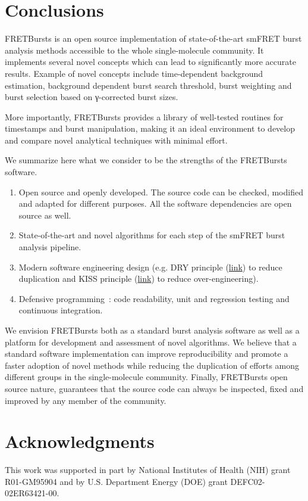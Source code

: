 \section{Conclusions}
\label{sec:conclusions}

FRETBursts is an open source implementation of state-of-the-art smFRET burst analysis methods
accessible to the whole single-molecule community.
It implements several novel concepts which can lead
to significantly more accurate results. Example of novel concepts include
time-dependent background estimation, background dependent burst search threshold,
burst weighting and burst selection based on γ-corrected burst sizes.

More importantly, FRETBursts provides a library of well-tested routines
for timestamps and burst manipulation, making it an ideal environment to
develop and compare novel analytical techniques with minimal effort.

We summarize here what we consider to be the strengths
of the FRETBursts software.

\begin{enumerate}
\item Open source and openly developed. The source code can be checked, modified and
adapted for different purposes. All the software dependencies are open source as well.
\item State-of-the-art and novel algorithms for each step of the
smFRET burst analysis pipeline.
\item Modern software engineering design (e.g. DRY principle
(\href{http://en.wikipedia.org/wiki/Don\%27t_repeat_yourself}{link})
to reduce duplication and KISS principle
(\href{http://en.wikipedia.org/wiki/KISS_principle}{link})
to reduce over-engineering).
\item Defensive programming~\cite{Prli__2012}: code readability,
unit and regression testing and continuous integration.
\end{enumerate}

We envision FRETBursts both as a standard burst analysis
software as well as a platform for development and assessment of novel algorithms.
We believe that a standard software implementation can improve
reproducibility and promote a faster adoption of novel methods 
while reducing the duplication of efforts among different groups
in the single-molecule community.
Finally, FRETBursts open source nature, guarantees that the source code
can always be inspected, fixed and improved
by any member of the community.


\section*{Acknowledgments}
This work was supported in part by National Institutes of Health (NIH)
grant R01-GM95904 and by U.S. Department Energy (DOE) grant DEFC02-02ER63421-00.
